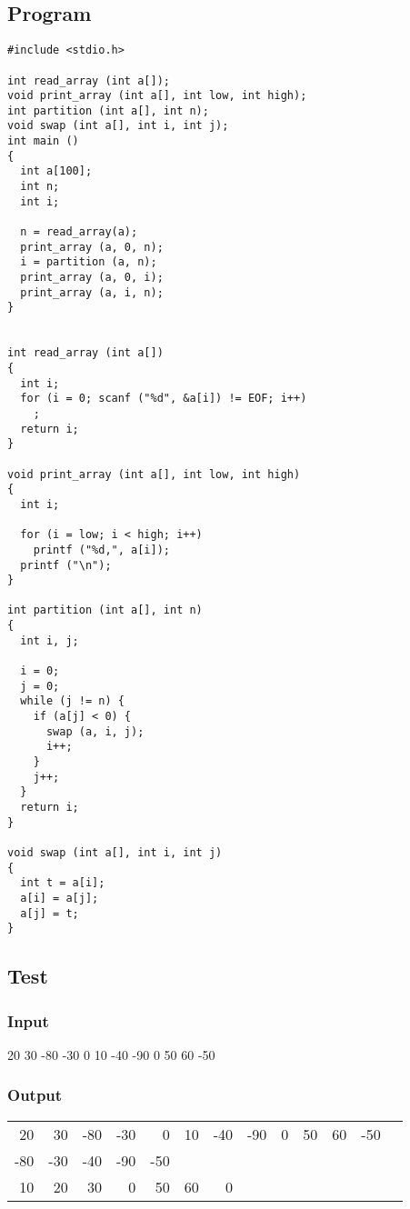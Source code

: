 \documentclass[11pt]{article}
\begin{document}
\subsection*{Program}
\label{sec-3-4}
\begin{verbatim}
#include <stdio.h>

int read_array (int a[]);
void print_array (int a[], int low, int high);
int partition (int a[], int n);
void swap (int a[], int i, int j);
int main ()
{
  int a[100];
  int n;
  int i;

  n = read_array(a);
  print_array (a, 0, n);
  i = partition (a, n);
  print_array (a, 0, i);
  print_array (a, i, n);  
}


int read_array (int a[])
{
  int i;
  for (i = 0; scanf ("%d", &a[i]) != EOF; i++)
    ;
  return i;
}

void print_array (int a[], int low, int high)
{
  int i;

  for (i = low; i < high; i++)
    printf ("%d,", a[i]);
  printf ("\n");
}

int partition (int a[], int n)
{
  int i, j;

  i = 0;
  j = 0;
  while (j != n) {
    if (a[j] < 0) {
      swap (a, i, j);
      i++;
    }
    j++;
  }
  return i;
}

void swap (int a[], int i, int j)
{
  int t = a[i];
  a[i] = a[j];
  a[j] = t;
}
\end{verbatim}
\subsection*{Test}
\label{sec-3-5}
\subsubsection*{Input}
\label{sec-3-5-1}
20  30 -80 -30  0  10  -40  -90  0  50 60  -50
\subsubsection*{Output}
\label{sec-3-5-2}
\begin{center}
\begin{tabular}{rrrrrrrrrrrrl}
20 & 30 & -80 & -30 & 0 & 10 & -40 & -90 & 0 & 50 & 60 & -50 & \\
-80 & -30 & -40 & -90 & -50 &  &  &  &  &  &  &  & \\
10 & 20 & 30 & 0 & 50 & 60 & 0 &  &  &  &  &  & \\
\end{tabular}
\end{center}
\end{document}
